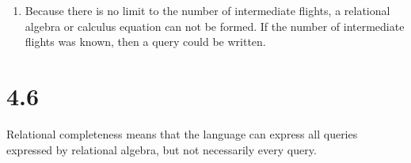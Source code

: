 \documentclass[11pt]{article}
\begin{document}
\begin{enumerate}
TRC: $\{C1.eid | C1 \in Certified ]wedge \exists C2 \in Certified(\exists C3 \in Certified(C1.eid = C2.eid \wedge C2.eid = C3.eid \wedge C1.aid \neq C2.aid \wedge C2.aid \neq C3.aid \wedge C3.aid \neq C1.aid \wedge \neg(\exists C4 \in Certified(C3.eid = C4.eid\wedge C1.aid \neq C4.aid \wedge C2.aid \neq C4.aid \wedge C3.aid \neq C4.aid))))\}$
\setcounter{enumi}{10}
\item Because there is no limit to the number of intermediate flights, a relational algebra or calculus equation can not be formed. If the number of intermediate flights was known, then a query could be written.
\end{enumerate}
\section*{4.6}
Relational completeness means that the language can express all queries expressed by relational algebra, but not necessarily every query.
\end{document}
